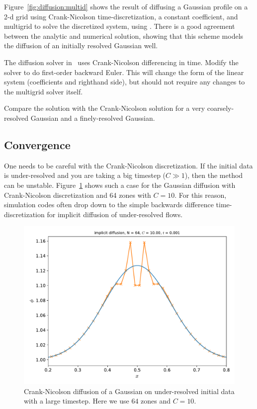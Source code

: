 Figure~\ref{fig:diffusion:multid} shows the result of diffusing a
Gaussian profile on a 2-d grid using Crank-Nicolson
time-discretization, a constant coefficient, and multigrid to solve
the discretized system, using \pyro.  There is a good agreement
between the analytic and numerical solution, showing that this scheme
models the diffusion of an initially resolved Gaussian well.


\begin{exercise}
{The diffusion solver in \pyro\ uses Crank-Nicolson differencing in time.  
Modify the solver to do first-order backward Euler.  This will change
the form of the linear system (coefficients and righthand side), but
should not require any changes to the multigrid solver itself. 

Compare the solution with the Crank-Nicolson solution for a very coarsely-resolved
Gaussian and a finely-resolved Gaussian.
}
\end{exercise}


\subsection{Convergence}

One needs to be careful with the Crank-Nicolson discretization.  If
the initial data is under-resolved and you are taking a big timestep
($C \gg 1$), then the method can be unstable.
Figure~\ref{fig:diff:cnunstable} shows such a case for the Gaussian
diffusion with Crank-Nicolson discretization and 64 zones with $C =
10$.  For this reason, simulation codes often drop down to the
simple backwards difference time-discretization for implicit diffusion
of under-resolved flows.

\begin{figure}
\centering
\includegraphics[width=\linewidth]{diff-implicit-64-CFL_10_0}
\caption[Under-resolved Crank-Nicolson diffusion]
{\label{fig:diff:cnunstable} Crank-Nicolson diffusion of a Gaussian
on under-resolved initial data with a large timestep.  Here we use
$64$ zones and $C= 10$.  \\ }
\end{figure}


